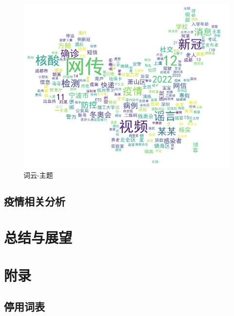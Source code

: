 \documentclass[UTF8]{ctexart}
\begin{document}
\begin{figure}[!ht]
    \includegraphics[width=\linewidth]{../figures/wordcloud_topics}
    \caption{词云-主题}
    \label{fig:wordcloud_topics}
\end{figure}



\subsection{疫情相关分析}

\pagebreak

\section{总结与展望}


\appendix
\section{附录}

\subsection{停用词表} \label{subsec:stopwords}
\end{document}
